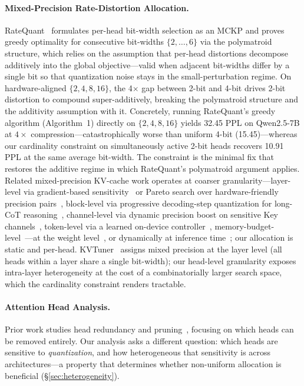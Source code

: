 \paragraph{Mixed-Precision Rate-Distortion Allocation.}
RateQuant~\cite{zuo2026ratequant} formulates per-head bit-width selection as an MCKP and proves greedy optimality for consecutive bit-widths $\{2,\ldots,6\}$ via the polymatroid structure, which relies on the assumption that per-head distortions decompose additively into the global objective---valid when adjacent bit-widths differ by a single bit so that quantization noise stays in the small-perturbation regime.
On hardware-aligned $\{2,4,8,16\}$, the 4$\times$ gap between 2-bit and 4-bit drives 2-bit distortion to compound super-additively, breaking the polymatroid structure and the additivity assumption with it.
Concretely, running RateQuant's greedy algorithm (Algorithm~1) directly on $\{2,4,8,16\}$ yields 32.45 PPL on Qwen2.5-7B at $4\times$ compression---catastrophically worse than uniform 4-bit (15.45)---whereas our cardinality constraint on simultaneously active 2-bit heads recovers 10.91 PPL at the same average bit-width.
The constraint is the minimal fix that restores the additive regime in which RateQuant's polymatroid argument applies.
Related mixed-precision KV-cache work operates at coarser granularity---layer-level via gradient-based sensitivity~\cite{li2025kvmix} or Pareto search over hardware-friendly precision pairs~\cite{li2025kvtuner}, block-level via progressive decoding-step quantization for long-CoT reasoning~\cite{liu2025pmkvq}, channel-level via dynamic precision boost on sensitive Key channels~\cite{xia2025kitty}, token-level via a learned on-device controller~\cite{haeriboroujeni2026dontwaste}, memory-budget-level~\cite{lei2026arkv}---at the weight level~\cite{kim2024squeezellm}, or dynamically at inference time~\cite{zhang2025mixkvq}; our allocation is static and per-head.
KVTuner~\cite{li2025kvtuner} assigns mixed precision at the layer level (all heads within a layer share a single bit-width); our head-level granularity exposes intra-layer heterogeneity at the cost of a combinatorially larger search space, which the cardinality constraint renders tractable.

\paragraph{Attention Head Analysis.}
Prior work studies head redundancy and pruning~\cite{voita2019analyzing,michel2019sixteen}, focusing on which heads can be removed entirely.
Our analysis asks a different question: which heads are sensitive to \emph{quantization}, and how heterogeneous that sensitivity is across architectures---a property that determines whether non-uniform allocation is beneficial (\S\ref{sec:heterogeneity}).
